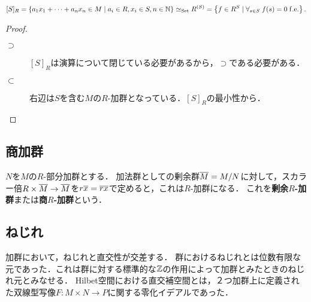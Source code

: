 \documentclass[uplatex,dvipdfmx]{jsreport}
\begin{document}
\begin{lemma}[生成された部分加群の元の表示]
    \[[S]_R=\left\{a_1x_1+\cdots+a_nx_n\in M\mid a_i\in R,x_i\in S, n\in\mathbb{N}\right\}\simeq_{\mathrm{Set}} R^{(S)}=\left\{f\in R^S\mid\forall_{s\in S}\;f(s)=0\;\mathrm{f.e.}\right\}.\]
\end{lemma}
\begin{proof}\mbox{}
    \begin{description}
        \item[$\supset$] $[S]_R$は演算について閉じている必要があるから，$\supset$である必要がある．
        \item[$\subset$] 右辺は$S$を含む$M$の$R$-加群となっている．$[S]_R$の最小性から．
    \end{description}
\end{proof}

\subsection{商加群}

\begin{definition}
    $N$を$M$の$R$-部分加群とする．
    加法群としての剰余群$\overline{M}=M/N$に対して，スカラー倍$R\times\overline{M}\to\overline{M}$を$r\overline{x}=\overline{rx}$で定めると，これは$R$-加群になる．
    これを\textbf{剰余$R$-加群}または\textbf{商$R$-加群}という．
\end{definition}

\subsection{ねじれ}

\begin{tcolorbox}[colframe=ForestGreen, colback=ForestGreen!10!white,breakable,colbacktitle=ForestGreen!40!white,coltitle=black,fonttitle=\bfseries\sffamily,
title=]
    加群において，ねじれと直交性が交差する．
    群におけるねじれとは位数有限な元であった．これは群に対する標準的な$\mathbb{Z}$の作用によって加群とみたときのねじれ元とみなせる．
    Hilbet空間における直交補空間とは，２つ加群上に定義された双線型写像$F:M\times N\to P$に関する零化イデアルであった．
\end{tcolorbox}
\end{document}
